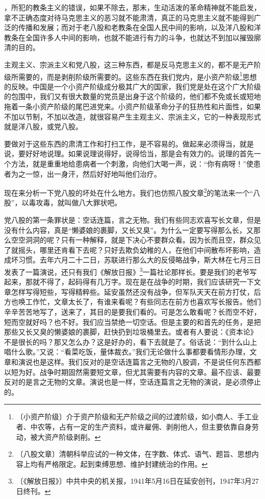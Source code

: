 \documentclass[12pt,UTF-8,openany]{ctexbook}
\begin{document}
\begin{normalsize}
，所犯的教条主义的错误，如果不除去，那末，生动活泼的革命精神就不能启发，拿不正确态度对待马克思主义的恶习就不能肃清，真正的马克思主义就不能得到广泛的传播和发展；而对于老八股和老教条在全国人民中间的影响，以及洋八股和洋教条在全国许多人中间的影响，也就不能进行有力的斗争，也就达不到加以摧毁廓清的目的。
    
    主观主义、宗派主义和党八股，这三种东西，都是反马克思主义的，都不是无产阶级所需要的，而是剥削阶级所需要的。这些东西在我们党内，是小资产阶级\footnote{〔小资产阶级〕介于资产阶级和无产阶级之间的过渡阶级，如小商人、手工业者、中农等，占有一定的生产资料，或许雇佣、剥削他人，但主要依靠自身劳动，被大资产阶级剥削。}思想的反映。中国是一个小资产阶级成分极其广大的国家，我们党是处在这个广大阶级的包围中，我们又有很大数量的党员是出身于这个阶级的，他们都不免或长或短地拖着一条小资产阶级的尾巴进党来。小资产阶级革命分子的狂热性和片面性，如果不加以节制，不加以改造，就很容易产生主观主义、宗派主义，它的一种表现形式就是洋八股，或党八股。
    
    要做对于这些东西的肃清工作和打扫工作，是不容易的。做起来必须得当，就是说，要好好地说理。如果说理说得好，说得恰当，那是会有效力的。说理的首先一个方法，就是重重地给患病者一个刺激，向他们大喝一声，说：“你有病呀！”使患者为之一惊，出一身汗，然后好好地叫他们治疗。
    
    现在来分析一下党八股的坏处在什么地方。我们也仿照八股文章\footnote{〔八股文章〕清朝科举应试的一种文体，在字数、体式、语气、题旨、思想内容上均有严格限定。起到束缚思想、维护封建统治的作用。}的笔法来一个“八股”，以毒攻毒，就叫做八大罪状吧。
    
    党八股的第一条罪状是：空话连篇，言之无物。我们有些同志欢喜写长文章，但是没有什么内容，真是“懒婆娘的裹脚，又长又臭”。为什么一定要写得那么长，又那么空空洞洞的呢？只有一种解释，就是下决心不要群众看。因为长而且空，群众见了就摇头，哪里还肯看下去呢？只好去欺负幼稚的人，在他们中间散布坏影响，造成坏习惯。去年六月二十二日，苏联进行那么大的反侵略战争，斯大林在七月三日发表了一篇演说，还只有我们《解放日报》\footnote{〔《解放日报》〕中共中央的机关报，1941年5月16日在延安创刊，1947年3月27日终刊。}一篇社论那样长。要是我们的老爷写起来，那就不得了，起码得有几万字。现在是在战争的时期，我们应该研究一下文章怎样写得短些，写得精粹些。延安虽然还没有战争，但军队天天在前方打仗，后方也唤工作忙，文章太长了，有谁来看呢？有些同志在前方也喜欢写长报告。他们辛辛苦苦地写了，送来了，其目的是要我们看的。可是怎么敢看呢？长而空不好，短而空就好吗？也不好。我们应当禁绝一切空话。但是主要的和首先的任务，是把那些又长又臭的懒婆娘的裹脚，赶快扔到垃圾桶里去。或者有人要说：《资本论》不是很长的吗？那又怎么办？这是好办的，看下去就是了。俗话说：“到什么山上唱什么歌。”又说：“看菜吃饭，量体裁衣。”我们无论做什么事都要看情形办理，文章和演说也是这样。我们反对的是空话连篇言之无物的八股调，不是说任何东西都以短为好。战争时期固然需要短文章，但尤其需要有内容的文章。最不应该、最要反对的是言之无物的文章。演说也是一样，空话连篇言之无物的演说，是必须停止的。
    

\end{normalsize}
\end{document}
